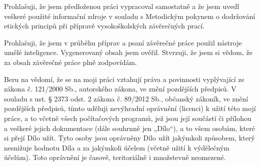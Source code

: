 \documentclass[czech,bachelor,oneside]{ctufit-thesis}
\begin{document}
\begin{declarationpage}
Prohlašuji, že jsem předloženou práci vypracoval samostatně a že jsem uvedl veškeré použité
informační zdroje v souladu s Metodickým pokynem o dodržování etických principů při přípravě
vysokoškolských závěrečných prací.

Prohlašuji, že jsem v průběhu příprav a psaní závěrečné práce použil nástroje umělé
inteligence. Vygenerovaný obsah jsem ověřil. Stvrzuji, že jsem si vědom, že za obsah
závěrečné práce plně zodpovídám.

Beru na vědomí, že se na moji práci vztahují práva a povinnosti vyplývající ze zákona č. 121/2000 Sb.,
autorského zákona, ve znění pozdějších předpisů. V souladu s ust. § 2373 odst. 2 zákona č. 89/2012
Sb., občanský zákoník, ve znění pozdějších předpisů, tímto uděluji nevýhradní oprávnění (licenci) k
užití této mojí práce, a to včetně všech počítačových programů, jež jsou její součástí či přílohou a
veškeré jejich dokumentace (dále souhrnně jen „Dílo“), a to všem osobám, které si přejí Dílo užít. Tyto
osoby jsou oprávněny Dílo užít jakýmkoli způsobem, který nesnižuje hodnotu Díla a za jakýmkoli
účelem (včetně užití k výdělečným účelům). Toto oprávnění je časově, teritoriálně i množstevně
neomezené. 
\end{declarationpage}

\printtwopageabstract
\end{document}
